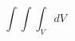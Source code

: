 \documentclass{ltjsarticle}
\begin{document}
\[ \int \!\!\! \int \!\!\! \int_{V} dV \]
\end{document}
